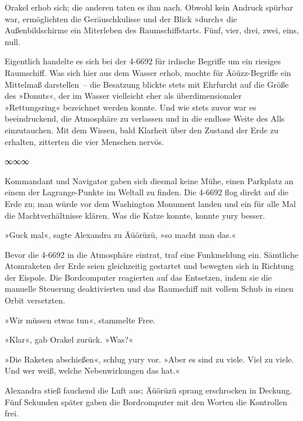 
Orakel erhob sich; die anderen taten es ihm nach. Obwohl kein Andruck spürbar war, ermöglichten die Geräuschkulisse und der Blick »durch« die Außenbildschirme ein Miterleben des Raumschiffstarts. Fünf, vier, drei, zwei, eins, null.

Eigentlich handelte es sich bei der 4-6692 für irdische Begriffe um ein riesiges Raumschiff. Was sich hier aus dem Wasser erhob, mochte für Äöüzz-Begriffe ein Mittelmaß darstellen~– die Besatzung blickte stets mit Ehrfurcht auf die Größe des »Donuts«, der im Wasser vielleicht eher als überdimensionaler »Rettungsring« bezeichnet werden konnte. Und wie stets zuvor war es beeindruckend, die Atmosphäre zu verlassen und in die endlose Weite des Alls einzutauchen. Mit dem Wissen, bald Klarheit über den Zustand der Erde zu erhalten, zitterten die vier Menschen nervös.

\begin{center}
∞∞∞
\end{center}

Kommandant und Navigator gaben sich diesmal keine Mühe, einen Parkplatz an einem der Lagrange-Punkte im Weltall zu finden. Die 4-6692 flog direkt auf die Erde zu; man würde vor dem Washington Monument landen und ein für alle Mal die Machtverhältnisse klären. Was die Katze konnte, konnte yury besser.

»Guck mal«, sagte Alexandra zu Äüörüzü, »so macht man das.«

Bevor die 4-6692 in die Atmosphäre eintrat, traf eine Funkmeldung ein. Sämtliche Atomraketen der Erde seien gleichzeitig gestartet und bewegten sich in Richtung der Eispole. Die Bordcomputer reagierten auf das Entsetzen, indem sie die manuelle Steuerung deaktivierten und das Raumschiff mit vollem Schub in einen Orbit versetzten.

»Wir müssen etwas tun«, stammelte Free.

»Klar«, gab Orakel zurück. »Was?«

»Die Raketen abschießen«, schlug yury vor. »Aber es sind zu viele. Viel zu viele. Und wer weiß, welche Nebenwirkungen das hat.«

Alexandra stieß fauchend die Luft aus; Äüörüzü sprang erschrocken in Deckung. Fünf Sekunden später gaben die Bordcomputer mit den Worten  die Kontrollen frei.

